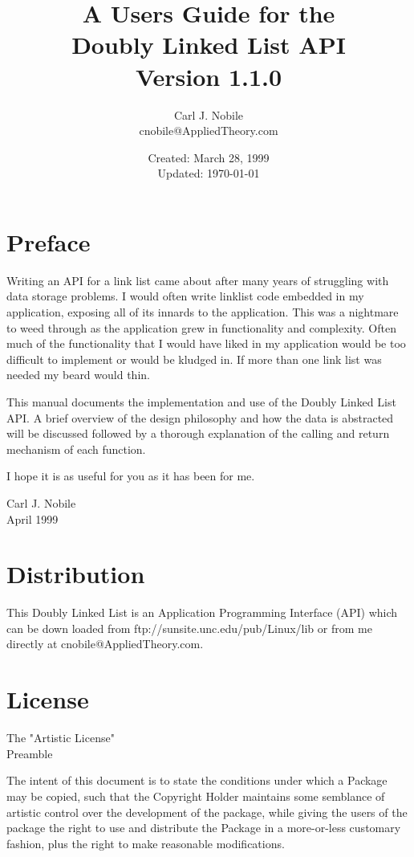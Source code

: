 \documentclass[10pt,letterpaper]{report}
\begin{document}
\title{A Users Guide for the\\
       Doubly Linked List API\\
       Version 1.1.0}
\author{Carl J. Nobile\\
	cnobile@AppliedTheory.com}
\date{Created: March 28, 1999\\
	Updated: \today}
\maketitle

\chapter*{Preface}
Writing an API for a link list came about after many years of struggling with data storage problems.  I would often write link\-list code embedded in my application, exposing all of its innards to the application.  This was a nightmare to weed through as the application grew in functionality and complexity.  Often much of the functionality that I would have liked in my application would be too difficult to implement or would be kludged in.  If more than one link list was needed my beard would thin.
\vspace{8pt}

\noindent
This manual documents the implementation and use of the Doubly Linked List API.  A brief overview of the design philosophy and how the data is abstracted will be discussed followed by a thorough explanation of the calling and return mechanism of each function.
\vspace{8pt}

\noindent
I hope it is as useful for you as it has been for me.
\vspace{8pt}
\begin{flushright}
Carl J. Nobile\\
April 1999
\end{flushright}

\chapter*{Distribution}
This Doubly Linked List is an Application Programming Interface (API) which can be down loaded from ftp://sunsite.unc.edu/pub/Linux/lib or from me directly at cnobile@AppliedTheory.com.

\chapter*{License}
\begin{center}
\Large			 The "Artistic License"\\
\vspace{8pt}
\Large				Preamble\\
\end{center}
The intent of this document is to state the conditions under which a Package may be copied, such that the Copyright Holder maintains some semblance of artistic control over the development of the package, while giving the users of the package the right to use and distribute the Package in a more-or-less customary fashion, plus the right to make reasonable modifications.
\vspace{8pt}
\end{document}
